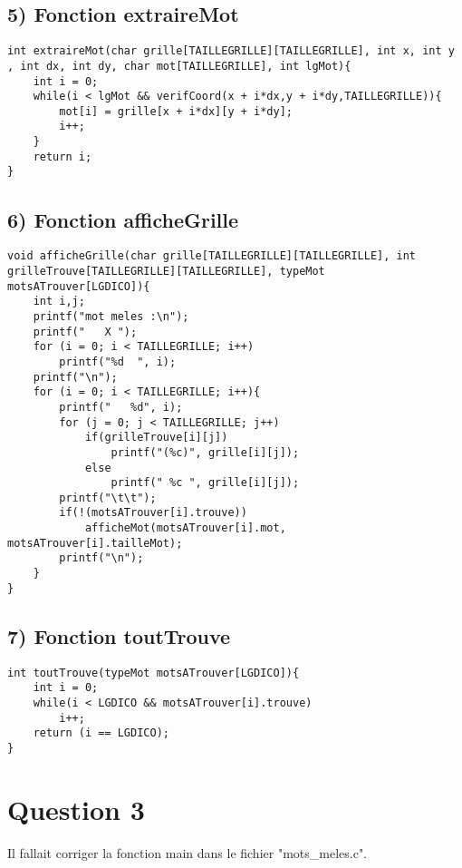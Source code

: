 \documentclass[a4paper,11pt]{article}
\begin{document}
\subsection*{5) Fonction extraireMot}
\begin{lstlisting}[caption=La fonction extraireMot]
int extraireMot(char grille[TAILLEGRILLE][TAILLEGRILLE], int x, int y , int dx, int dy, char mot[TAILLEGRILLE], int lgMot){
	int i = 0;
	while(i < lgMot && verifCoord(x + i*dx,y + i*dy,TAILLEGRILLE)){
		mot[i] = grille[x + i*dx][y + i*dy];
		i++;
	}	
	return i;
}
\end{lstlisting}

\newpage{}

\subsection*{6) Fonction afficheGrille}
\begin{lstlisting}[caption=La fonction afficheGrille]
void afficheGrille(char grille[TAILLEGRILLE][TAILLEGRILLE], int grilleTrouve[TAILLEGRILLE][TAILLEGRILLE], typeMot motsATrouver[LGDICO]){
	int i,j;
	printf("mot meles :\n");
	printf("   X ");
	for (i = 0; i < TAILLEGRILLE; i++)
		printf("%d  ", i);
	printf("\n");
	for (i = 0; i < TAILLEGRILLE; i++){
		printf("   %d", i);
		for (j = 0; j < TAILLEGRILLE; j++)
			if(grilleTrouve[i][j])
				printf("(%c)", grille[i][j]);
			else
				printf(" %c ", grille[i][j]);
		printf("\t\t");
		if(!(motsATrouver[i].trouve))
			afficheMot(motsATrouver[i].mot, motsATrouver[i].tailleMot);
		printf("\n");
	}
}
\end{lstlisting}

\subsection*{7) Fonction toutTrouve}
\begin{lstlisting}[caption=La fonction toutTrouve]
int toutTrouve(typeMot motsATrouver[LGDICO]){
	int i = 0;
	while(i < LGDICO && motsATrouver[i].trouve)
		i++;
	return (i == LGDICO);
}
\end{lstlisting}

\newpage{}

\section*{Question 3}

Il fallait corriger la fonction main dans le fichier "mots\_meles.c".
\end{document}
